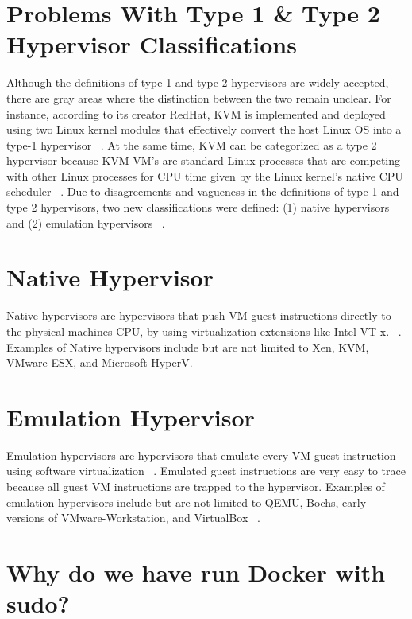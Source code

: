 \documentclass[12pt]{report}
\begin{document}
\begin{doublespace}
\section{Problems With Type 1 \& Type 2 Hypervisor Classifications}

Although the definitions of type 1 and type 2 hypervisors are widely accepted, there are gray areas where the distinction between the two remain unclear. For instance, according to its creator RedHat, KVM is implemented and deployed using two Linux kernel modules that effectively convert the host Linux OS into a type-1 hypervisor ~\cite{graziano2011performance}. At the same time, KVM can be categorized as a type 2 hypervisor because KVM VM's are standard Linux processes that are competing with other Linux processes for CPU time given by the Linux kernel's native CPU scheduler ~\cite{kvmcpuschedule}. Due to disagreements and vagueness in the definitions of type 1 and type 2 hypervisors, two new classifications were defined: (1) native hypervisors and (2) emulation hypervisors ~\cite{10.1145/2775111}.



\section{Native Hypervisor}

Native hypervisors are hypervisors that push VM guest instructions directly to the physical machines CPU, by using virtualization extensions like Intel VT-x. ~\cite{10.1145/2775111}. Examples of Native hypervisors include but are not limited to Xen, KVM, VMware ESX, and Microsoft HyperV.


\section{Emulation Hypervisor}
Emulation hypervisors are hypervisors that emulate every VM guest instruction using software virtualization ~\cite{10.1145/2775111}. Emulated guest instructions are very easy to trace because all guest VM instructions are trapped to the hypervisor. Examples of emulation hypervisors include but are not limited to QEMU, Bochs, early versions of VMware-Workstation, and VirtualBox ~\cite{10.1145/2775111}.


\section{Why do we have run Docker with sudo?}


\end{doublespace}
\end{document}
